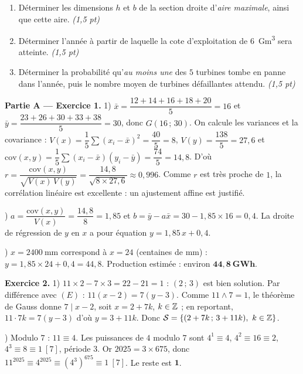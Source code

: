 \begin{enumerate}[label=\textbf{Tâche \arabic*.},leftmargin=2.4em]
\item Déterminer les dimensions $h$ et $b$ de la section droite d'\emph{aire maximale}, ainsi que
cette aire. \hfill\textit{(1,5 pt)}
\item Déterminer l'année à partir de laquelle la cote d'exploitation de \SI{6}{\giga\metre\cubed}
sera atteinte. \hfill\textit{(1,5 pt)}
\item Déterminer la probabilité qu'\emph{au moins une} des $5$ turbines tombe en panne dans l'année,
puis le nombre moyen de turbines défaillantes attendu. \hfill\textit{(1,5 pt)}
\end{enumerate}
\par{}


\noindent\textbf{Partie A — Exercice 1.}
1) $\bar x=\dfrac{12+14+16+18+20}{5}=16$ et $\bar y=\dfrac{23+26+30+33+38}{5}=30$, donc $G(16\,;\,30)$.
On calcule les variances et la covariance : $V(x)=\dfrac{1}{5}\sum(x_i-\bar x)^2=\dfrac{40}{5}=8$,
$V(y)=\dfrac{138}{5}=27{,}6$ et $\mathrm{cov}(x,y)=\dfrac{1}{5}\sum(x_i-\bar x)(y_i-\bar y)=\dfrac{74}{5}=14{,}8$.
D'où $r=\dfrac{\mathrm{cov}(x,y)}{\sqrt{V(x)\,V(y)}}=\dfrac{14{,}8}{\sqrt{8\times27{,}6}}\approx0{,}996$.
Comme $r$ est très proche de $1$, la corrélation linéaire est excellente : un ajustement affine est justifié.

) $a=\dfrac{\mathrm{cov}(x,y)}{V(x)}=\dfrac{14{,}8}{8}=1{,}85$ et $b=\bar y-a\bar x=30-1{,}85\times16=0{,}4$.
La droite de régression de $y$ en $x$ a pour équation $\boxed{y=1{,}85\,x+0{,}4}$.

) $x=\SI{2400}{\milli\metre}$ correspond à $x=24$ (centaines de mm) :
$y=1{,}85\times24+0{,}4=44{,}8$. Production estimée : environ $\mathbf{44{,}8\ \text{GWh}}$.

\medskip
\noindent\textbf{Exercice 2.}
1) $11\times2-7\times3=22-21=1$ : $(2\,;\,3)$ est bien solution. Par différence avec $(E)$ :
$11(x-2)=7(y-3)$. Comme $11\wedge7=1$, le théorème de Gauss donne $7\mid x-2$, soit $x=2+7k$,
$k\in\mathbb{Z}$ ; en reportant, $11\cdot7k=7(y-3)$ d'où $y=3+11k$. Donc
$\mathcal{S}=\{(2+7k\,;\,3+11k),\ k\in\Z\}$.

) Modulo $7$ : $11\equiv4$. Les puissances de $4$ modulo $7$ sont $4^1\equiv4$,
$4^2\equiv16\equiv2$, $4^3\equiv8\equiv1\ [7]$, période $3$. Or $2025=3\times675$, donc
$11^{2025}\equiv4^{2025}\equiv(4^3)^{675}\equiv1\ [7]$. Le reste est $\mathbf{1}$.

